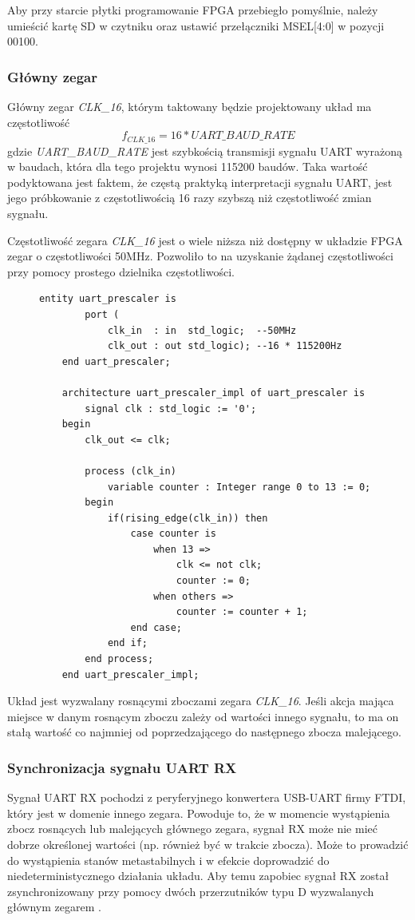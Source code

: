Aby przy starcie płytki programowanie FPGA przebiegło pomyślnie, należy umieścić kartę SD w czytniku oraz ustawić przełączniki MSEL[4:0] w pozycji 00100.

\subsubsection{Główny zegar}
\label{clk-16}
Główny zegar \textit{CLK\_16}, którym taktowany będzie projektowany układ ma częstotliwość
\begin{equation}
f_{CLK\_16} = 16 * UART\_BAUD\_RATE
\end{equation}
gdzie \textit{UART\_BAUD\_RATE} jest szybkością transmisji sygnału UART wyrażoną w baudach, która dla tego projektu wynosi 115200 baudów. Taka wartość podyktowana jest faktem, że częstą praktyką interpretacji sygnału UART, jest jego próbkowanie z częstotliwością 16 razy szybszą niż częstotliwość zmian sygnału.

Częstotliwość zegara \textit{CLK\_16} jest o wiele niższa niż dostępny w układzie FPGA zegar o częstotliwości 50MHz. Pozwoliło to na uzyskanie żądanej częstotliwości przy pomocy prostego dzielnika częstotliwości.

\begin{figure}[!h]
	\begin{lstlisting}[style=vhdl, caption={Dzielnik częstotliwości}, captionpos=b]
	entity uart_prescaler is
		port (
			clk_in  : in  std_logic;  --50MHz
			clk_out : out std_logic); --16 * 115200Hz
	end uart_prescaler;
	
	architecture uart_prescaler_impl of uart_prescaler is
		signal clk : std_logic := '0';
	begin
		clk_out <= clk;
		
		process (clk_in) 
			variable counter : Integer range 0 to 13 := 0;
		begin	
			if(rising_edge(clk_in)) then
				case counter is
					when 13 =>
						clk <= not clk;
						counter := 0;
					when others =>
						counter := counter + 1;
				end case;
			end if;
		end process;
	end uart_prescaler_impl;
	\end{lstlisting}
\end{figure}

Układ jest wyzwalany rosnącymi zboczami zegara \textit{CLK\_16}. Jeśli akcja mająca miejsce w danym rosnącym zboczu zależy od wartości innego sygnału, to ma on stałą wartość co najmniej od poprzedzającego do następnego zbocza malejącego.

\subsubsection{Synchronizacja sygnału UART RX}
\label{uart-sync}
Sygnał UART RX pochodzi z peryferyjnego konwertera USB-UART firmy FTDI, który jest w domenie innego zegara. Powoduje to, że w momencie wystąpienia zbocz rosnących lub malejących głównego zegara, sygnał RX może nie mieć dobrze określonej wartości (np. również być w trakcie zbocza). Może to prowadzić do wystąpienia stanów metastabilnych \cite{altera-metastability} i w efekcie doprowadzić do niedeterministycznego działania układu. Aby temu zapobiec sygnał RX został zsynchronizowany przy pomocy dwóch przerzutników typu D wyzwalanych głównym zegarem \cite{altera-metastability, 2ff-synchronization}. 

